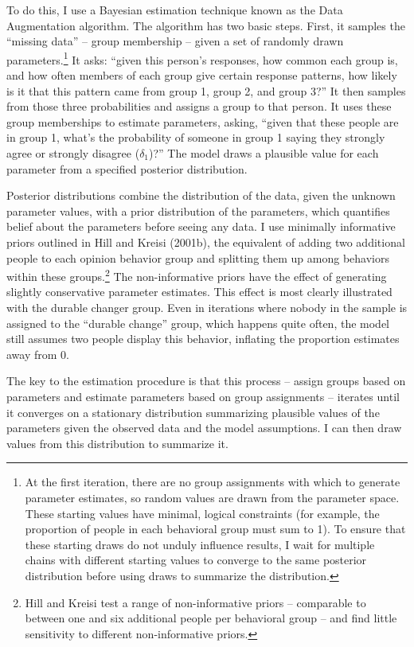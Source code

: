 \documentclass[12pt,]{article}
\begin{document}
To do this, I use a Bayesian estimation technique known as the Data Augmentation algorithm. The algorithm has two basic steps. First, it samples the ``missing data'' -- group membership -- given a set of randomly drawn parameters.\footnote{At the first iteration, there are no group assignments with which to generate parameter estimates, so random values are drawn from the parameter space. These starting values have minimal, logical constraints (for example, the proportion of people in each behavioral group must sum to 1). To ensure that these starting draws do not unduly influence results, I wait for multiple chains with different starting values to converge to the same posterior distribution before using draws to summarize the distribution.} It asks: ``given this person's responses, how common each group is, and how often members of each group give certain response patterns, how likely is it that this pattern came from group 1, group 2, and group 3?'' It then samples from those three probabilities and assigns a group to that person. It uses these group memberships to estimate parameters, asking, ``given that these people are in group 1, what's the probability of someone in group 1 saying they strongly agree or strongly disagree (\(\delta_1\))?'' The model draws a plausible value for each parameter from a specified posterior distribution.

Posterior distributions combine the distribution of the data, given the unknown parameter values, with a prior distribution of the parameters, which quantifies belief about the parameters before seeing any data. I use minimally informative priors outlined in Hill and Kreisi (2001b), the equivalent of adding two additional people to each opinion behavior group and splitting them up among behaviors within these groups.\footnote{Hill and Kreisi test a range of non-informative priors -- comparable to between one and six additional people per behavioral group -- and find little sensitivity to different non-informative priors.} The non-informative priors have the effect of generating slightly conservative parameter estimates. This effect is most clearly illustrated with the durable changer group. Even in iterations where nobody in the sample is assigned to the ``durable change'' group, which happens quite often, the model still assumes two people display this behavior, inflating the proportion estimates away from 0.

The key to the estimation procedure is that this process -- assign groups based on parameters and estimate parameters based on group assignments -- iterates until it converges on a stationary distribution summarizing plausible values of the parameters given the observed data and the model assumptions. I can then draw values from this distribution to summarize it.
\end{document}
